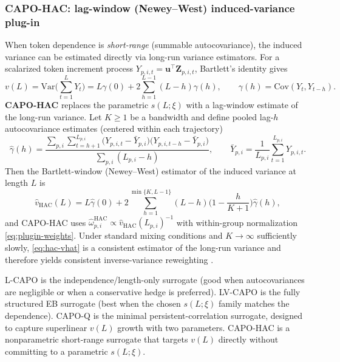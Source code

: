 \subsubsection{CAPO-HAC: lag-window (Newey--West) induced-variance plug-in}\label{subsec:capo-hac-plugin}
When token dependence is \emph{short-range} (summable autocovariance), the induced variance can be estimated directly via long-run variance estimators. For a scalarized token increment process $Y_{p,i,t}=\bm u^\top \boldsymbol Z_{p,i,t}$, Bartlett’s identity gives
\begin{equation}
\label{eq:bartlett-vL}
v(L)=\mathrm{Var}\Big(\sum_{t=1}^{L} Y_t\Big)=L\gamma(0)+2\sum_{h=1}^{L-1}(L-h)\gamma(h),\qquad \gamma(h)=\mathrm{Cov}(Y_t,Y_{t-h}).
\end{equation}
\textbf{CAPO-HAC} replaces the parametric $s(L;\xi)$ with a lag-window estimate of the long-run variance. Let $K\ge 1$ be a bandwidth and define pooled lag-$h$ autocovariance estimates (centered within each trajectory)
\begin{equation}
\label{eq:gammahat-pooled}
\widehat\gamma(h)=\frac{\sum_{p,i}\sum_{t=h+1}^{L_{p,i}}\big(Y_{p,i,t}-\bar Y_{p,i}\big)\big(Y_{p,i,t-h}-\bar Y_{p,i}\big)}{\sum_{p,i}(L_{p,i}-h)},\qquad \bar Y_{p,i}=\frac{1}{L_{p,i}}\sum_{t=1}^{L_{p,i}}Y_{p,i,t}.
\end{equation}
Then the Bartlett-window (Newey--West) estimator of the induced variance at length $L$ is
\begin{equation}
\label{eq:hac-vhat}
\widehat v_{\mathrm{HAC}}(L)=L\widehat\gamma(0)+2\sum_{h=1}^{\min\{K,L-1\}}(L-h)\Big(1-\frac{h}{K+1}\Big)\widehat\gamma(h),
\end{equation}
and CAPO-HAC uses $\widehat\omega_{p,i}^{\mathrm{HAC}}\propto \widehat v_{\mathrm{HAC}}(L_{p,i})^{-1}$ with within-group normalization \eqref{eq:plugin-weights}. Under standard mixing conditions and $K\to\infty$ sufficiently slowly, \eqref{eq:hac-vhat} is a consistent estimator of the long-run variance and therefore yields consistent inverse-variance reweighting \citep{newey1987simple,andrews1991heteroskedasticity}.

\begin{remark}
L-CAPO is the independence/length-only surrogate (good when autocovariances are negligible or when a conservative hedge is preferred). LV-CAPO is the fully structured EB surrogate (best when the chosen $s(L;\xi)$ family matches the dependence). CAPO-Q is the minimal persistent-correlation surrogate, designed to capture superlinear $v(L)$ growth with two parameters. CAPO-HAC is a nonparametric short-range surrogate that targets $v(L)$ directly without committing to a parametric $s(L;\xi)$.
\end{remark}
